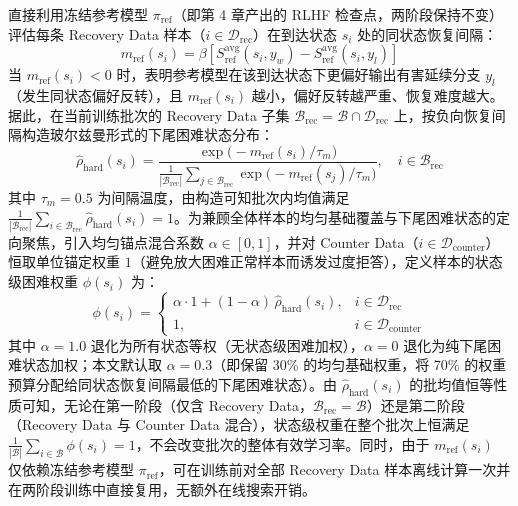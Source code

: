 \documentclass[fontset=fandol,type=master,campus=shenzhen,etitleauto=true]{hithesisbook}
\begin{document}
直接利用冻结参考模型 $\pi_{\text{ref}}$（即第 4 章产出的 RLHF 检查点，两阶段保持不变）评估每条 Recovery Data 样本（$i \in \mathcal{D}_{\text{rec}}$）在到达状态 $s_i$ 处的同状态恢复间隔：
\begin{equation}
m_{\text{ref}}(s_i) = \beta \left[ S_{\text{ref}}^{\text{avg}}(s_i, y_w) - S_{\text{ref}}^{\text{avg}}(s_i, y_l) \right]
\end{equation}
当 $m_{\text{ref}}(s_i) < 0$ 时，表明参考模型在该到达状态下更偏好输出有害延续分支 $y_l$（发生同状态偏好反转），且 $m_{\text{ref}}(s_i)$ 越小，偏好反转越严重、恢复难度越大。据此，在当前训练批次的 Recovery Data 子集 $\mathcal{B}_{\text{rec}} = \mathcal{B} \cap \mathcal{D}_{\text{rec}}$ 上，按负向恢复间隔构造玻尔兹曼形式的下尾困难状态分布：
\begin{equation}
\hat{\rho}_{\text{hard}}(s_i) = \frac{\exp\!\big(-m_{\text{ref}}(s_i)/\tau_m\big)}{\frac{1}{|\mathcal{B}_{\text{rec}}|}\sum_{j \in \mathcal{B}_{\text{rec}}} \exp\!\big(-m_{\text{ref}}(s_j)/\tau_m\big)}, \quad i \in \mathcal{B}_{\text{rec}}
\end{equation}
其中 $\tau_m = 0.5$ 为间隔温度，由构造可知批次内均值满足 $\frac{1}{|\mathcal{B}_{\text{rec}}|}\sum_{i \in \mathcal{B}_{\text{rec}}} \hat{\rho}_{\text{hard}}(s_i) = 1$。为兼顾全体样本的均匀基础覆盖与下尾困难状态的定向聚焦，引入均匀锚点混合系数 $\alpha \in [0, 1]$，并对 Counter Data（$i \in \mathcal{D}_{\text{counter}}$）恒取单位锚定权重 $1$（避免放大困难正常样本而诱发过度拒答），定义样本的状态级困难权重 $\phi(s_i)$ 为：
\begin{equation}
\phi(s_i) = \begin{cases}
\alpha \cdot 1 + (1 - \alpha)\,\hat{\rho}_{\text{hard}}(s_i), & i \in \mathcal{D}_{\text{rec}} \\
1, & i \in \mathcal{D}_{\text{counter}}
\end{cases}
\end{equation}
其中 $\alpha=1.0$ 退化为所有状态等权（无状态级困难加权），$\alpha=0$ 退化为纯下尾困难状态加权；本文默认取 $\alpha=0.3$（即保留 30\% 的均匀基础权重，将 70\% 的权重预算分配给同状态恢复间隔最低的下尾困难状态）。由 $\hat{\rho}_{\text{hard}}(s_i)$ 的批均值恒等性质可知，无论在第一阶段（仅含 Recovery Data，$\mathcal{B}_{\text{rec}}=\mathcal{B}$）还是第二阶段（Recovery Data 与 Counter Data 混合），状态级权重在整个批次上恒满足 $\frac{1}{|\mathcal{B}|}\sum_{i \in \mathcal{B}} \phi(s_i) = 1$，不会改变批次的整体有效学习率。同时，由于 $m_{\text{ref}}(s_i)$ 仅依赖冻结参考模型 $\pi_{\text{ref}}$，可在训练前对全部 Recovery Data 样本离线计算一次并在两阶段训练中直接复用，无额外在线搜索开销。
\end{document}
